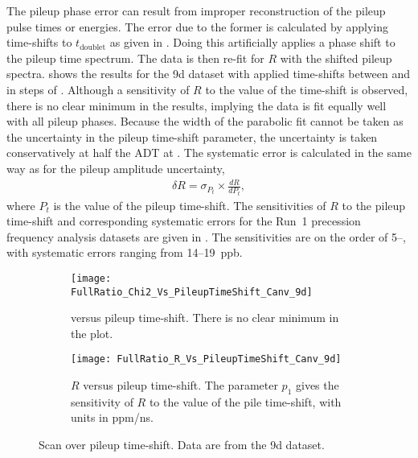 The pileup phase error can result from improper reconstruction of the pileup pulse times or energies. The error due to the former is calculated by applying time-shifts to $t_{\text{doublet}}$ as given in . Doing this artificially applies a phase shift to the pileup time spectrum. The data is then re-fit for $R$ with the shifted pileup spectra.  shows the results for the 9d dataset with applied time-shifts between  and  in steps of . Although a sensitivity of $R$ to the value of the time-shift is observed, there is no clear minimum in the \chisq results, implying the data is fit equally well with all pileup phases. Because the width of the \chisq parabolic fit cannot be taken as the uncertainty in the pileup time-shift parameter, the uncertainty is taken conservatively at half the ADT at . The systematic error is calculated in the same way as for the pileup amplitude uncertainty,
    \begin{align}
        \delta R = \sigma_{P_{t}} \times \frac{dR}{dP_{t}},
    \end{align}
where $P_{t}$ is the value of the pileup time-shift. The sensitivities of $R$ to the pileup time-shift and corresponding systematic errors for the Run~1 precession frequency analysis datasets are given in . The sensitivities are on the order of 5--, with systematic errors ranging from 14--\SI{19}{ppb}.


\begin{figure}
\centering
    \begin{subfigure}[t]{0.45\textwidth}
        \centering
        \texttt{[image: FullRatio\_Chi2\_Vs\_PileupTimeShift\_Canv\_9d]}
        \caption{\chisq versus pileup time-shift. There is no clear minimum in the plot.} 
    \end{subfigure}%
    \hspace{1cm}
    \begin{subfigure}[t]{0.45\textwidth}
        \centering
        \texttt{[image: FullRatio\_R\_Vs\_PileupTimeShift\_Canv\_9d]}
        \caption{$R$ versus pileup time-shift. The parameter $p_{1}$ gives the sensitivity of $R$ to the value of the pile time-shift, with units in ppm/ns.}
    \end{subfigure}
\caption[Pileup time-shift scan]{Scan over pileup time-shift. Data are from the 9d dataset.}
\label{fig:PTSscan}
\end{figure}


